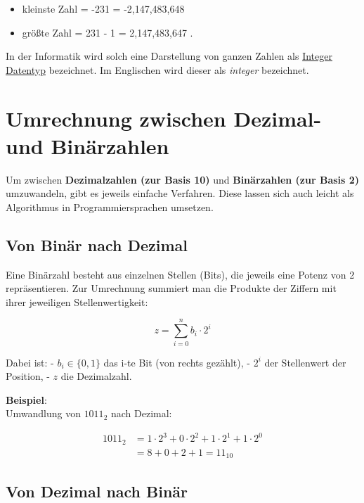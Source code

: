 \documentclass[
  letterpaper,
  DIV=11,
  numbers=noendperiod]{scrreprt}
\providecommand{\tightlist}{%
  \setlength{\itemsep}{0pt}\setlength{\parskip}{0pt}}\usepackage{longtable,booktabs,array}
\begin{document}
\begin{itemize}
\tightlist
\item
  kleinste Zahl = -231 = -2,147,483,648
\item
  größte Zahl = 231 - 1 = 2,147,483,647 .
\end{itemize}

In der Informatik wird solch eine Darstellung von ganzen Zahlen als
\href{https://de.wikipedia.org/wiki/Integer_(Datentyp)}{Integer
Datentyp} bezeichnet. Im Englischen wird dieser als \emph{integer}
bezeichnet.

\section{Umrechnung zwischen Dezimal- und
Binärzahlen}\label{umrechnung-zwischen-dezimal--und-binuxe4rzahlen}

Um zwischen \textbf{Dezimalzahlen (zur Basis 10)} und
\textbf{Binärzahlen (zur Basis 2)} umzuwandeln, gibt es jeweils einfache
Verfahren. Diese lassen sich auch leicht als Algorithmus in
Programmiersprachen umsetzen.

\subsection{Von Binär nach Dezimal}\label{von-binuxe4r-nach-dezimal}

Eine Binärzahl besteht aus einzelnen Stellen (Bits), die jeweils eine
Potenz von 2 repräsentieren. Zur Umrechnung summiert man die Produkte
der Ziffern mit ihrer jeweiligen Stellenwertigkeit:

\[
z = \sum_{i=0}^{n} b_i \cdot 2^i
\]

Dabei ist: - \(b_i \in \{0, 1\}\) das i-te Bit (von rechts gezählt), -
\(2^i\) der Stellenwert der Position, - \(z\) die Dezimalzahl.

\textbf{Beispiel}:\\
Umwandlung von \(1011_2\) nach Dezimal:

\[
\begin{align*}
1011_2 &= 1 \cdot 2^3 + 0 \cdot 2^2 + 1 \cdot 2^1 + 1 \cdot 2^0 \\
       &= 8 + 0 + 2 + 1 = 11_{10}
\end{align*}
\]

\subsection{Von Dezimal nach Binär}\label{von-dezimal-nach-binuxe4r}
\end{document}

